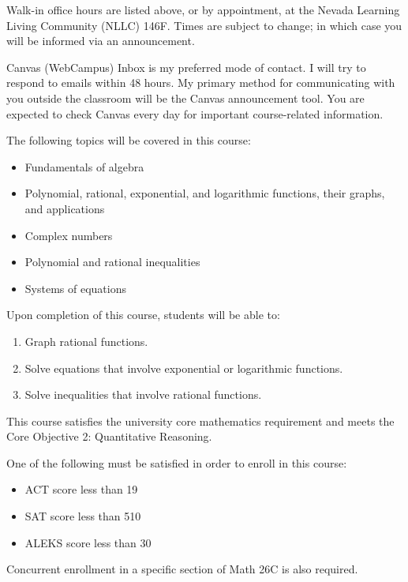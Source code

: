 \documentclass[a4paper]{syllabus}
\begin{document}
\maketitle


Walk-in office hours are listed above, or by appointment, at the Nevada Learning Living Community (NLLC) 146F.
Times are subject to change; in which case you will be informed via an announcement.

Canvas (WebCampus) Inbox is my preferred mode of contact.
I will try to respond to emails within 48 hours.
My primary method for communicating with you outside the classroom will be the Canvas announcement tool.
You are expected to check Canvas every day for important course-related information.

The following topics will be covered in this course:
\begin{itemize}
	\item Fundamentals of algebra
	\item Polynomial, rational, exponential, and logarithmic functions, their graphs, and applications
	\item Complex numbers
	\item Polynomial and rational inequalities
	\item Systems of equations
\end{itemize}

Upon completion of this course, students will be able to:
\begin{enumerate}
	\item Graph rational functions.
	\item Solve equations that involve exponential or logarithmic functions.
	\item Solve inequalities that involve rational functions.
\end{enumerate}
This course satisfies the university core mathematics requirement and meets the Core Objective 2: Quantitative Reasoning.

One of the following must be satisfied in order to enroll in this course:
\begin{itemize}
	\item ACT score less than 19
	\item SAT score less than 510
	\item ALEKS score less than 30
\end{itemize}
Concurrent enrollment in a specific section of Math 26C is also required.
\end{document}
